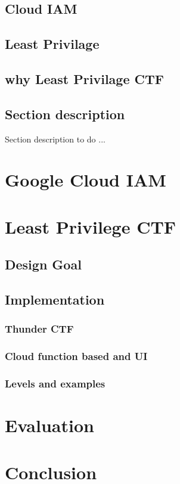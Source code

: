 \documentclass[sigconf]{acmart}
\begin{document}
\subsection{Cloud IAM}
\subsection{Least Privilage}
\subsection{why Least Privilage CTF}

\subsection{Section description}
Section description to do ...
\section{Google Cloud IAM}

\section{Least Privilege CTF}

\subsection{Design Goal}
\subsection{Implementation}
\subsubsection{Thunder CTF}
\subsubsection{Cloud function based and UI}
\subsubsection{Levels and examples}
\section{Evaluation}
\section{Conclusion}
\end{document}
